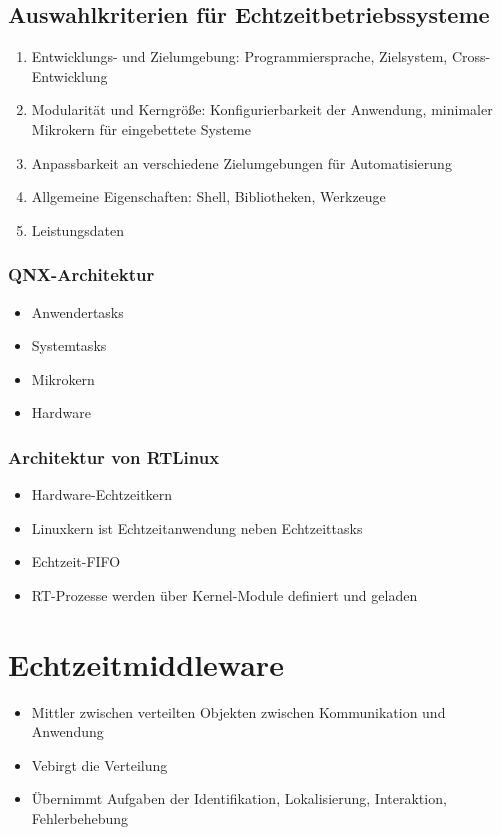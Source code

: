 \subsection{Auswahlkriterien für Echtzeitbetriebssysteme}
\begin{enumerate}
	\item Entwicklungs- und Zielumgebung: Programmiersprache, Zielsystem, Cross-Entwicklung
	\item Modularität und Kerngröße: Konfigurierbarkeit der Anwendung, minimaler Mikrokern für eingebettete Systeme
	\item Anpassbarkeit an verschiedene Zielumgebungen für Automatisierung
	\item Allgemeine Eigenschaften: Shell, Bibliotheken, Werkzeuge
	\item Leistungsdaten
\end{enumerate}

\subsubsection{QNX-Architektur}
\begin{itemize}
	\item Anwendertasks
	\item Systemtasks
	\item Mikrokern
	\item Hardware
\end{itemize}

\subsubsection{Architektur von RTLinux}
\begin{itemize}
	\item Hardware-Echtzeitkern
	\item Linuxkern ist Echtzeitanwendung neben Echtzeittasks
	\item Echtzeit-FIFO
	\item RT-Prozesse werden über Kernel-Module definiert und geladen
\end{itemize}



\section{Echtzeitmiddleware}
\begin{itemize}
	\item Mittler zwischen verteilten Objekten zwischen Kommunikation und Anwendung
	\item Vebirgt die Verteilung
	\item Übernimmt Aufgaben der Identifikation, Lokalisierung, Interaktion, Fehlerbehebung
\end{itemize}

